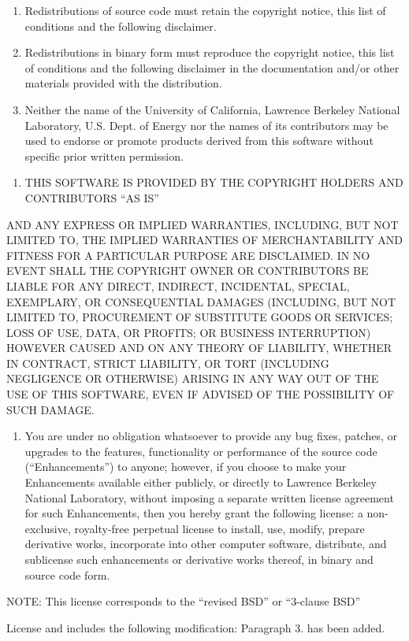\begin{enumerate}
\def\labelenumi{(\arabic{enumi})}
\item
  Redistributions of source code must retain the copyright notice, this list of conditions and the following disclaimer.
\item
  Redistributions in binary form must reproduce the copyright notice, this list of conditions and the following disclaimer in the documentation and/or other materials provided with the distribution.
\item
  Neither the name of the University of California, Lawrence Berkeley National Laboratory, U.S. Dept. of Energy nor the names of its contributors may be used to endorse or promote products derived from this software without specific prior written permission. 
\end{enumerate}

\begin{enumerate}
\def\labelenumi{\arabic{enumi}.}
\setcounter{enumi}{1}
\tightlist
\item
  THIS SOFTWARE IS PROVIDED BY THE COPYRIGHT HOLDERS AND CONTRIBUTORS ``AS IS''
\end{enumerate}

AND ANY EXPRESS OR IMPLIED WARRANTIES, INCLUDING, BUT NOT LIMITED TO, THE IMPLIED WARRANTIES OF MERCHANTABILITY AND FITNESS FOR A PARTICULAR PURPOSE ARE DISCLAIMED. IN NO EVENT SHALL THE COPYRIGHT OWNER OR CONTRIBUTORS BE LIABLE FOR ANY DIRECT, INDIRECT, INCIDENTAL, SPECIAL, EXEMPLARY, OR CONSEQUENTIAL DAMAGES (INCLUDING, BUT NOT LIMITED TO, PROCUREMENT OF SUBSTITUTE GOODS OR SERVICES; LOSS OF USE, DATA, OR PROFITS; OR BUSINESS INTERRUPTION) HOWEVER CAUSED AND ON ANY THEORY OF LIABILITY, WHETHER IN CONTRACT, STRICT LIABILITY, OR TORT (INCLUDING NEGLIGENCE OR OTHERWISE) ARISING IN ANY WAY OUT OF THE USE OF THIS SOFTWARE, EVEN IF ADVISED OF THE POSSIBILITY OF SUCH DAMAGE.

\begin{enumerate}
\def\labelenumi{\arabic{enumi}.}
\setcounter{enumi}{2}
\tightlist
\item
  You are under no obligation whatsoever to provide any bug fixes, patches, or upgrades to the features, functionality or performance of the source code (``Enhancements'') to anyone; however, if you choose to make your Enhancements available either publicly, or directly to Lawrence Berkeley National Laboratory, without imposing a separate written license agreement for such Enhancements, then you hereby grant the following license: a non-exclusive, royalty-free perpetual license to install, use, modify, prepare derivative works, incorporate into other computer software, distribute, and sublicense such enhancements or derivative works thereof, in binary and source code form.
\end{enumerate}

NOTE: This license corresponds to the ``revised BSD'' or ``3-clause BSD''

License and includes the following modification: Paragraph 3. has been added.
